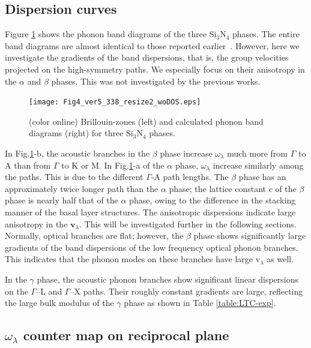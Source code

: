 \documentclass[twocolumn,amsmath,amssymb,a4paper,prb,superscriptaddress,floatfix]{revtex4-1}
\begin{document}
\subsection{Dispersion curves}

Figure \ref{fig:Fig4_ver5_338} shows the phonon band diagrams of the three
Si$_3$N$_4$ phases. The entire band diagrams are almost identical to those
reported earlier~\cite{kuwabara,xu}. However, here we investigate the gradients
of the band dispersions, that is, the group velocities projected on the
high-symmetry paths. We especially focus on their anisotropy in the $\alpha$ and
$\beta$ phases. This was not investigated by the previous works.

\begin{figure}[ht]
 \begin{center}
  \texttt{[image: Fig4\_ver5\_338\_resize2\_woDOS.eps]}
  \caption{(color online) Brillouin-zones (left) and calculated phonon band diagrams (right) for three Si$_3$N$_4$ phases.
  \label{fig:Fig4_ver5_338} }
 \end{center}
\end{figure}

In Fig.\ref{fig:Fig4_ver5_338}-b, the acoustic branches in the $\beta$ phase
increase $\omega_\lambda$ much more from $\Gamma$ to A than from $\Gamma$ to K
or M.  In Fig.\ref{fig:Fig4_ver5_338}-a of the $\alpha$ phase,
$\omega_{\lambda}$ increase similarly among the paths.  This is due to the
different $\Gamma$-A path lengths.  The $\beta$ phase has an approximately twice
longer path than the $\alpha$ phase; the lattice constant $c$ of the $\beta$
phase is nearly half that of the $\alpha$ phase, owing to the difference in the
stacking manner of the basal layer structures. The anisotropic dispersions
indicate large anisotropy in the $\mathbf{v}_\lambda$. This will be investigated
further in the following sections.  Normally, optical branches are flat;
however, the $\beta$ phase shows significantly large gradients of the band
dispersions of the low frequency optical phonon branches. This indicates that
the phonon modes on these branches have large \rm{v}$_{\lambda}$ as well.

In the $\gamma$ phase, the acoustic phonon branches show significant linear
dispersions on the $\Gamma$--L and $\Gamma$--X paths.  Their roughly constant
gradients are large, reflecting the large bulk modulus of the $\gamma$ phase as
shown in Table \ref{table:LTC-exp}.

\subsection{$\omega_\lambda$ counter map on reciprocal plane}
\end{document}
